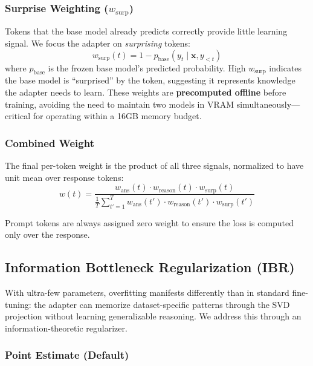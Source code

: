\documentclass{article}
\begin{document}
\subsubsection{Surprise Weighting ($w_{\text{surp}}$)}

Tokens that the base model already predicts correctly provide little learning signal. We focus the adapter on \textit{surprising} tokens:
\begin{equation}
  w_{\text{surp}}(t) = 1 - p_{\text{base}}(y_t \mid \mathbf{x}, y_{<t})
  \label{eq:w_surp}
\end{equation}
where $p_{\text{base}}$ is the frozen base model's predicted probability. High $w_{\text{surp}}$ indicates the base model is ``surprised'' by the token, suggesting it represents knowledge the adapter needs to learn. These weights are \textbf{precomputed offline} before training, avoiding the need to maintain two models in VRAM simultaneously---critical for operating within a 16GB memory budget.

\subsubsection{Combined Weight}

The final per-token weight is the product of all three signals, normalized to have unit mean over response tokens:
\begin{equation}
  w(t) = \frac{w_{\text{ans}}(t) \cdot w_{\text{reason}}(t) \cdot w_{\text{surp}}(t)}{\frac{1}{T}\sum_{t'=1}^{T} w_{\text{ans}}(t') \cdot w_{\text{reason}}(t') \cdot w_{\text{surp}}(t')}
  \label{eq:w_combined}
\end{equation}

Prompt tokens are always assigned zero weight to ensure the loss is computed only over the response.

\subsection{Information Bottleneck Regularization (IBR)}
\label{sec:ibr}

With ultra-few parameters, overfitting manifests differently than in standard fine-tuning: the adapter can memorize dataset-specific patterns through the SVD projection without learning generalizable reasoning. We address this through an information-theoretic regularizer.

\subsubsection{Point Estimate (Default)}
\end{document}
